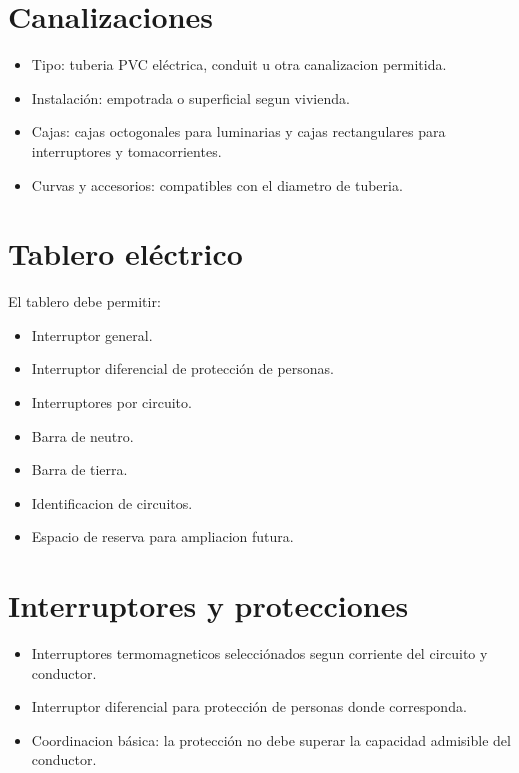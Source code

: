 \section{Canalizaciones}

\begin{itemize}
  \item Tipo: tuberia PVC eléctrica, conduit u otra canalizacion permitida.
  \item Instalación: empotrada o superficial segun vivienda.
  \item Cajas: cajas octogonales para luminarias y cajas rectangulares para interruptores y tomacorrientes.
  \item Curvas y accesorios: compatibles con el diametro de tuberia.
\end{itemize}

\section{Tablero eléctrico}

El tablero debe permitir:

\begin{itemize}
  \item Interruptor general.
  \item Interruptor diferencial de protección de personas.
  \item Interruptores por circuito.
  \item Barra de neutro.
  \item Barra de tierra.
  \item Identificacion de circuitos.
  \item Espacio de reserva para ampliacion futura.
\end{itemize}

\section{Interruptores y protecciones}

\begin{itemize}
  \item Interruptores termomagneticos selecciónados segun corriente del circuito y conductor.
  \item Interruptor diferencial para protección de personas donde corresponda.
  \item Coordinacion básica: la protección no debe superar la capacidad admisible del conductor.
\end{itemize}

